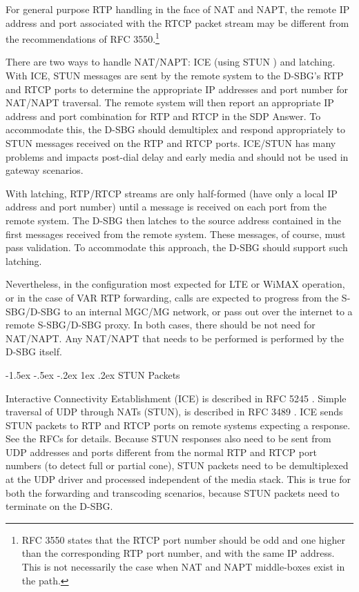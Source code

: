 \documentclass[letterpaper,final,notitlepage,twocolumn,10pt,twoside]{article}
\makeatletter
\let\normalsize = \small
\let\small = \footnotesize
\let\footnotesize = \scriptsize
\let\scriptsize = \tiny
\renewcommand\subsection{\@startsection{subsection}{2}{\z@}%
                                     {-1.5ex \@plus -.5ex \@minus -.2ex}%
                                     {1ex \@plus .2ex}%
                                     {\normalfont\normalsize\bfseries}}
\makeatother
\begin{document}
For general purpose RTP handling in the face of NAT and NAPT, the remote IP
address and port associated with the RTCP packet stream may be different from
the recommendations of RFC
3550.\footnote{RFC 3550 states that the RTCP port number should be odd and one
higher than the corresponding RTP port number, and with the same IP address.
This is not necessarily the case when NAT and NAPT middle-boxes exist in the
path.}

There are two ways to handle NAT/NAPT: ICE \cite{ICE} (using STUN \cite{STUN})
and latching.  With ICE, STUN messages are sent by the remote system to the
D-SBG's RTP and RTCP ports to determine the appropriate IP addresses and port
number for NAT/NAPT traversal.  The remote system will then report an
appropriate IP address and port combination for RTP and RTCP in the SDP Answer.
To accommodate this, the D-SBG should demultiplex and respond appropriately to
STUN messages received on the RTP and RTCP ports.  ICE/STUN has many problems
and impacts post-dial delay and early media and should not be used in gateway
scenarios.

With latching, RTP/RTCP streams are only half-formed (have only a local IP
address and port number) until a message is received on each port from the
remote system.  The D-SBG then latches to the source address contained in the
first messages received from the remote system.  These messages, of course, must
pass validation.  To accommodate this approach, the D-SBG should support such
latching.

Nevertheless, in the configuration most expected for LTE or WiMAX operation, or
in the case of VAR RTP forwarding, calls are expected to progress from the
S-SBG/D-SBG to an internal MGC/MG network, or pass out over the internet to a
remote S-SBG/D-SBG proxy.  In both cases, there should be not need for NAT/NAPT.
Any NAT/NAPT that needs to be performed is performed by the D-SBG itself.

\subsection{STUN Packets}

Interactive Connectivity Establishment (ICE) is described in {RFC 5245}
\cite{ICE}.  Simple traversal of UDP through NATs (STUN), is described in {RFC
3489} \cite{STUN}.  ICE sends STUN packets to RTP and RTCP ports on remote
systems expecting a response.  See the RFCs for details.  Because STUN
responses also need to be sent from UDP addresses and ports different from the
normal RTP and RTCP port numbers (to detect full or partial cone), STUN
packets need to be demultiplexed at the UDP driver and processed independent
of the media stack.  This is true for both the forwarding and transcoding
scenarios, because STUN packets need to terminate on the D-SBG.
\end{document}

